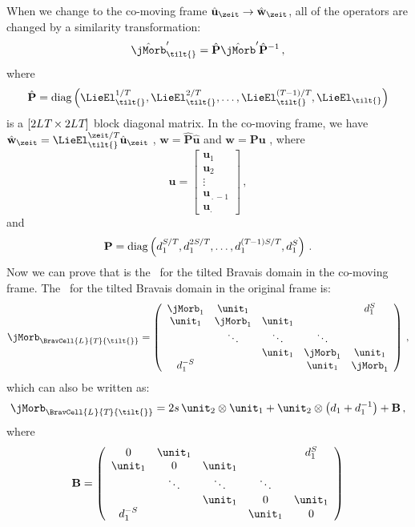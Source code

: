 When we change to the co-moving frame $\hat{\mathbf{u}}_\zeit \to \hat{\mathbf{w}}_\zeit$, all of the operators are changed by a similarity transformation:
\[
\hat{\mathbf{\jMorb}}_{\tilt{}}' =
\hat{\mathbf{P}} \hat{\mathbf{\jMorb}}' \hat{\mathbf{P}}^{-1} \, ,
\]
where
\[
\hat{\mathbf{P}} = \text{diag} \left(
\mathbf{\LieEl}^{1/\period{}}_\tilt{},
\mathbf{\LieEl}^{2/\period{}}_\tilt{},
\dots,
\mathbf{\LieEl}^{(\period{}-1)/\period{}}_\tilt{},
\mathbf{\LieEl}_\tilt{}
\right)
\]
is a $[2{L_{}}{T_{}}\times2{L_{}}{T_{}}]$ block diagonal matrix. In the co-moving frame, we have
\(
\hat{\mathbf{w}}_\zeit
= \mathbf{\LieEl}^{\zeit/\period{}}_\tilt{} \hat{\mathbf{u}}_\zeit
\)
,
\(
\hat{\mathbf{w}}
= \hat{\mathbf{P}} \hat{\mathbf{u}}
\)
and
\(
{\mathbf{w}}
={\mathbf{P}} {\mathbf{u}}
\)
,
where
\[
{\mathbf{u}} =
\left[\begin{array}{c}
{\mathbf{u}}_{1} \\ \hline
{\mathbf{u}}_{2}\\ \hline
 \vdots \\ \hline
{\mathbf{u}}_{\period{}-1} \\ \hline
{\mathbf{u}}_{\period{}}
 \end{array}\right]
 \, ,
\]
and
\[
{\mathbf{P}} = \text{diag} \left(
d_1^{S/{T_{}}},
d_1^{2S/{T_{}}},
\dots,
d_1^{({T_{}}-1)S/{T_{}}},
d_1^{S}
\right)
\, .
\]
Now we can prove that  is the \jacobianOrb\ for the tilted Bravais domain in the co-moving frame. The \jacobianOrb\ for the tilted Bravais domain in the original frame is:
\[
\jMorb_{\BravCell{\speriod{}}{\period{}}{\tilt{}}}=
\left(
\begin{array}{ccccc}
 \mathbf{\jMorb}_{1} & \unit_{1} &  &  & \shift_1^{S} \\
 \unit_{1} & \mathbf{\jMorb}_{1} & \unit_{1} &  &  \\
  & \ddots & \ddots & \ddots &  \\
  &  & \unit_{1} & \mathbf{\jMorb}_{1} & \unit_{1} \\
 \shift_1^{-S} &  &  & \unit_{1} & \mathbf{\jMorb}_{1} \\
\end{array}
\right) \, ,
\]
which can also be written as:
\[
\jMorb_{\BravCell{\speriod{}}{\period{}}{\tilt{}}}=
2 {s}\,\unit_2\otimes\unit_{1}
+
\unit_{2} \otimes \left(\shift_{1}+\shift_{1}^{-1}\right)
+
\mathbf{B} \, ,
\]
where
\[
\mathbf{B}=
\left(
\begin{array}{ccccc}
 0 & \unit_{1} &  &  & \shift_1^{S} \\
 \unit_{1} & 0 & \unit_{1} &  &  \\
  & \ddots & \ddots & \ddots &  \\
  &  & \unit_{1} & 0 & \unit_{1} \\
 \shift_1^{-S} &  &  & \unit_{1} & 0 \\
\end{array}
\right)
\]
